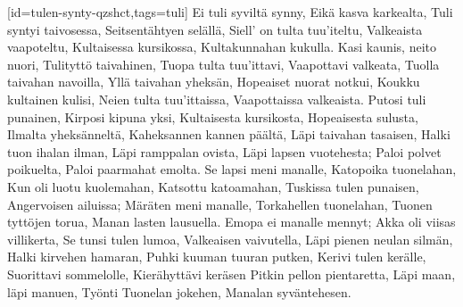 [id={tulen-synty-qzshct},tags={tuli}]
  \beginverse
    Ei tuli syviltä synny,
    Eikä kasva karkealta,
    Tuli syntyi taivosessa,
    Seitsentähtyen selällä,
    Siell' on tulta tuu'iteltu,
    Valkeaista vaapoteltu,
    Kultaisessa kursikossa,
    Kultakunnahan kukulla.
  \endverse
  \beginverse
    Kasi kaunis, neito nuori,
    Tulityttö taivahinen,
    Tuopa tulta tuu'ittavi,
    Vaapottavi valkeata,
    Tuolla taivahan navoilla,
    Yllä taivahan yheksän,
    Hopeaiset nuorat notkui,
    Koukku kultainen kulisi,
    Neien tulta tuu'ittaissa,
    Vaapottaissa valkeaista.
  \endverse
  \beginverse
    Putosi tuli punainen,
    Kirposi kipuna yksi,
    Kultaisesta kursikosta,
    Hopeaisesta sulusta,
    Ilmalta yheksänneltä,
    Kaheksannen kannen päältä,
    Läpi taivahan tasaisen,
    Halki tuon ihalan ilman,
    Läpi ramppalan ovista,
    Läpi lapsen vuotehesta;
    Paloi polvet poikuelta,
    Paloi paarmahat emolta.
  \endverse
  \beginverse
    Se lapsi meni manalle,
    Katopoika tuonelahan,
    Kun oli luotu kuolemahan,
    Katsottu katoamahan,
    Tuskissa tulen punaisen,
    Angervoisen ailuissa;
    Märäten meni manalle,
    Torkahellen tuonelahan,
    Tuonen tyttöjen torua,
    Manan lasten lausuella.
  \endverse
  \beginverse
    Emopa ei manalle mennyt;
    Akka oli viisas villikerta,
    Se tunsi tulen lumoa,
    Valkeaisen vaivutella,
    Läpi pienen neulan silmän,
    Halki kirvehen hamaran,
    Puhki kuuman tuuran putken,
    Kerivi tulen kerälle,
    Suorittavi sommelolle,
    Kierähyttävi keräsen
    Pitkin pellon pientaretta,
    Läpi maan, läpi manuen,
    Työnti Tuonelan jokehen,
    Manalan syväntehesen.
  \endverse
\endsong

